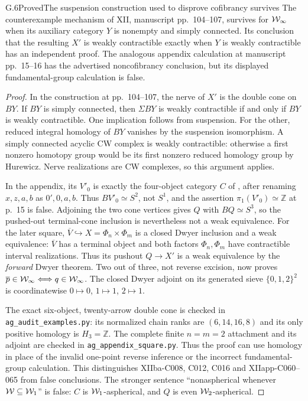 \begin{claim}{G.6}{Proved}{The suspension construction used to disprove cofibrancy survives}
The counterexample mechanism of XII, manuscript pp.~104--107, survives for $\mathcal{W}_{\infty}$ when its auxiliary category $Y$ is nonempty and simply connected. Its conclusion that the resulting $X'$ is weakly contractible exactly when $Y$ is weakly contractible has an independent proof. The analogous appendix calculation at manuscript pp.~15--16 has the advertised noncofibrancy conclusion, but its displayed fundamental-group calculation is false.
\end{claim}
\begin{proof}
In the construction at pp.~104--107, the nerve of $X'$ is the double cone on $BY$. If $BY$ is simply connected, then $\Sigma BY$ is weakly contractible if and only if $BY$ is weakly contractible. One implication follows from suspension. For the other, reduced integral homology of $BY$ vanishes by the suspension isomorphism. A simply connected acyclic CW complex is weakly contractible: otherwise a first nonzero homotopy group would be its first nonzero reduced homology group by Hurewicz. Nerve realizations are CW complexes, so this argument applies.

In the appendix, its $V'_0$ is exactly the four-object category $C$ of , after renaming $x,z,a,b$ as $0',0,a,b$. Thus $BV'_0\simeq S^2$, not $S^1$, and the assertion $\pi_1(V'_0)\simeq\mathbb Z$ at p.~15 is false. Adjoining the two cone vertices gives $Q$ with $BQ\simeq S^3$, so the pushed-out terminal-cone inclusion is nevertheless not a weak equivalence. For the later square, $\overline V\hookrightarrow X=\Phi_n\times\Phi_m$ is a closed Dwyer inclusion and a weak equivalence: $\overline V$ has a terminal object and both factors $\Phi_n,\Phi_m$ have contractible interval realizations. Thus its pushout $Q\to X'$ is a weak equivalence by the \emph{forward} Dwyer theorem. Two out of three, not reverse excision, now proves $\overline p\in\mathcal{W}_{\infty}\Longleftrightarrow q\in\mathcal{W}_{\infty}$. The closed Dwyer adjoint on its generated sieve $\{0,1,2\}^2$ is coordinatewise $0\mapsto0$, $1\mapsto1$, $2\mapsto1$.

The exact six-object, twenty-arrow double cone is checked in \texttt{ag\_audit\_examples.py}: its normalized chain ranks are $(6,14,16,8)$ and its only positive homology is $H_3=\mathbb Z$. The complete finite $n=m=2$ attachment and its adjoint are checked in \texttt{ag\_appendix\_square.py}. Thus the proof can use homology in place of the invalid one-point reverse inference or the incorrect fundamental-group calculation. This distinguishes XIIba-C008, C012, C016 and XIIapp-C060--065 from false conclusions. The stronger sentence ``nonaspherical whenever $\mathcal{W}\subseteq\mathcal{W}_1$'' is false: $C$ is $\mathcal{W}_1$-aspherical, and $Q$ is even $\mathcal{W}_2$-aspherical.
\end{proof}

